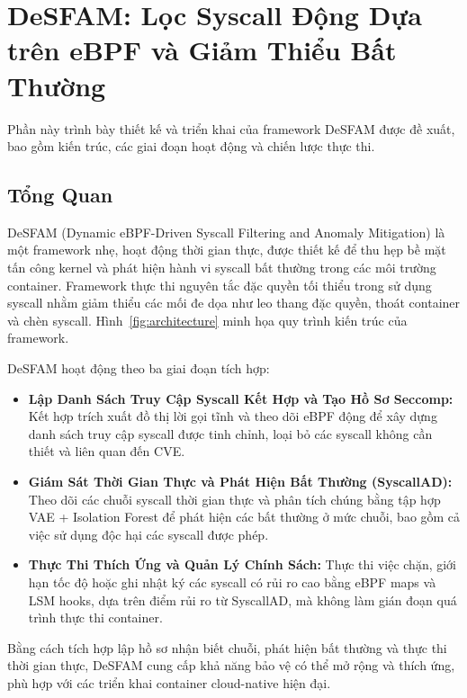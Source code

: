 \section{DeSFAM: Lọc Syscall Động Dựa trên eBPF và Giảm Thiểu Bất Thường}
\label{sec:desfam}

Phần này trình bày thiết kế và triển khai của framework DeSFAM được đề xuất, bao gồm
kiến trúc, các giai đoạn hoạt động và chiến lược thực thi.

\subsection{Tổng Quan}
\label{subsec:overview}

DeSFAM (Dynamic eBPF-Driven Syscall Filtering and Anomaly Mitigation) là một framework nhẹ,
hoạt động thời gian thực, được thiết kế để thu hẹp bề mặt tấn công kernel và phát hiện hành vi
syscall bất thường trong các môi trường container. Framework thực thi nguyên tắc đặc quyền tối
thiểu trong sử dụng syscall nhằm giảm thiểu các mối đe dọa như leo thang đặc quyền, thoát
container và chèn syscall.
Hình~\ref{fig:architecture} minh họa quy trình kiến trúc của framework.

DeSFAM hoạt động theo ba giai đoạn tích hợp:
\begin{itemize}
  \item \textbf{Lập Danh Sách Truy Cập Syscall Kết Hợp và Tạo Hồ Sơ Seccomp:} Kết hợp trích xuất
        đồ thị lời gọi tĩnh và theo dõi eBPF động để xây dựng danh sách truy cập syscall được
        tinh chỉnh, loại bỏ các syscall không cần thiết và liên quan đến CVE.
  \item \textbf{Giám Sát Thời Gian Thực và Phát Hiện Bất Thường (SyscallAD):} Theo dõi các
        chuỗi syscall thời gian thực và phân tích chúng bằng tập hợp VAE + Isolation Forest để
        phát hiện các bất thường ở mức chuỗi, bao gồm cả việc sử dụng độc hại các syscall được
        phép.
  \item \textbf{Thực Thi Thích Ứng và Quản Lý Chính Sách:} Thực thi việc chặn, giới hạn tốc độ
        hoặc ghi nhật ký các syscall có rủi ro cao bằng eBPF maps và LSM hooks, dựa trên điểm
        rủi ro từ SyscallAD, mà không làm gián đoạn quá trình thực thi container.
\end{itemize}

Bằng cách tích hợp lập hồ sơ nhận biết chuỗi, phát hiện bất thường và thực thi thời gian thực,
DeSFAM cung cấp khả năng bảo vệ có thể mở rộng và thích ứng, phù hợp với các triển khai
container cloud-native hiện đại.

